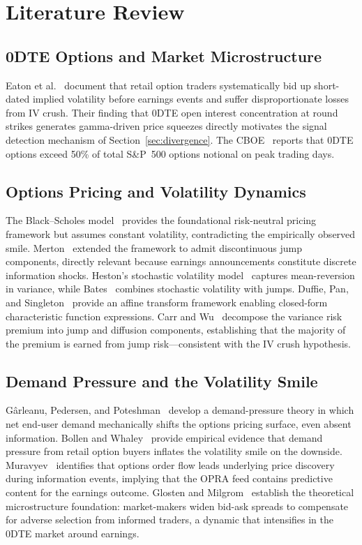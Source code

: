 \documentclass[10pt,twocolumn]{article}
\begin{document}
\section{Literature Review}
\label{sec:lit}

\subsection{0DTE Options and Market Microstructure}

Eaton et al.~\cite{eaton2026} document that retail option traders
systematically bid up short-dated implied volatility before earnings events and
suffer disproportionate losses from IV crush. Their finding that 0DTE open
interest concentration at round strikes generates gamma-driven price squeezes
directly motivates the signal detection mechanism of Section~\ref{sec:divergence}.
The CBOE~\cite{cboe2024} reports that 0DTE options exceed 50\% of total S\&P~500
options notional on peak trading days.

\subsection{Options Pricing and Volatility Dynamics}

The Black--Scholes model~\cite{black1973} provides the foundational
risk-neutral pricing framework but assumes constant volatility, contradicting
the empirically observed smile. Merton~\cite{merton1976} extended the
framework to admit discontinuous jump components, directly relevant because
earnings announcements constitute discrete information shocks. Heston's
stochastic volatility model~\cite{heston1993} captures mean-reversion in
variance, while Bates~\cite{bates1996} combines stochastic volatility with
jumps. Duffie, Pan, and Singleton~\cite{duffie2000} provide an affine
transform framework enabling closed-form characteristic function expressions.
Carr and Wu~\cite{carrwu2004} decompose the variance risk premium into jump
and diffusion components, establishing that the majority of the premium is
earned from jump risk---consistent with the IV crush hypothesis.

\subsection{Demand Pressure and the Volatility Smile}

G\^{a}rleanu, Pedersen, and Poteshman~\cite{garleanu2009} develop a
demand-pressure theory in which net end-user demand mechanically shifts the
options pricing surface, even absent information. Bollen and
Whaley~\cite{bollen2004} provide empirical evidence that demand pressure from
retail option buyers inflates the volatility smile on the downside.
Muravyev~\cite{muravyev2016} identifies that options order flow leads
underlying price discovery during information events, implying that the OPRA
feed contains predictive content for the earnings outcome. Glosten and
Milgrom~\cite{glosten1985} establish the theoretical microstructure foundation:
market-makers widen bid-ask spreads to compensate for adverse selection from
informed traders, a dynamic that intensifies in the 0DTE market around earnings.
\end{document}
